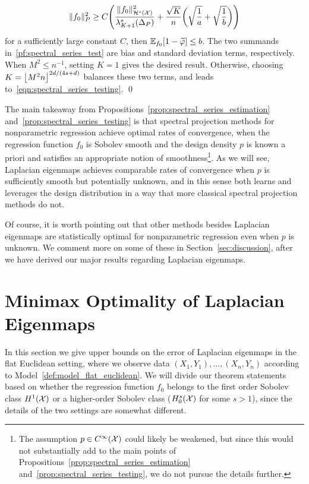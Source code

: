 \begin{equation}
\label{pf:spectral_series_test}
\|f_0\|_P^2 \geq C\Biggl(\frac{\|f_0\|_{\mathcal{H}^s(\mathcal{X})}^2}{\lambda_{K + 1}^s(\Delta_{P})} + \frac{\sqrt{K}}{n}\biggl(\sqrt{\frac{1}{a}} + \sqrt{\frac{1}{b}}\biggr)\Biggr)
\end{equation}
for a sufficiently large constant $C$, then $\mathbb{E}_{f_0}[1 - \widetilde{\varphi}] \leq b$. The two summands in~\eqref{pf:spectral_series_test} are bias and standard deviation terms, respectively. When $M^2 \leq n^{-1}$, setting $K = 1$ gives the desired result. Otherwise, choosing $K = \left\lfloor M^2n \right\rfloor^{2d/(4s + d)}$ balances these two terms, and leads to~\eqref{eqn:spectral_series_testing}. \qed

The main takeaway from Propositions~\ref{prop:spectral_series_estimation} and~\ref{prop:spectral_series_testing} is that spectral projection methods for nonparametric regression achieve optimal rates of convergence, when the regression function $f_0$ is Sobolev smooth and the design density $p$ is known a priori and satisfies an appropriate notion of smoothness\footnote{The assumption $p \in C^{\infty}(\mathcal{X})$ could likely be weakened, but since this would not substantially add to the main points of Propositions~\ref{prop:spectral_series_estimation} and~\ref{prop:spectral_series_testing}, we do not pursue the details further.}. As we will see, Laplacian eigenmaps achieves comparable rates of convergence when $p$ is sufficiently smooth but potentially unknown, and in this sense both learns and leverages the design distribution in a way that more classical spectral projection methods do not.

Of course, it is worth pointing out that other methods besides Laplacian eigenmaps are statistically optimal for nonparametric regression even when $p$ is unknown. We comment more on some of these in Section~\ref{sec:discussion}, after we have derived our major results regarding Laplacian eigenmaps.

\section{Minimax Optimality of Laplacian Eigenmaps}
\label{sec:minimax_optimal_laplacian_eigenmaps}

In this section we give upper bounds on the error of Laplacian eigenmaps in the flat Euclidean setting, where we observe data $(X_1,Y_1),\ldots,(X_n,Y_n)$ according to Model~\ref{def:model_flat_euclidean}. We will divide our theorem statements based on whether the regression function $f_0$ belongs to the first order Sobolev class $H^1(\mathcal{X})$ or a higher-order Sobolev class ($H_0^{s}(\mathcal{X})$ for some $s > 1$), since the details of the two settings are somewhat different.

